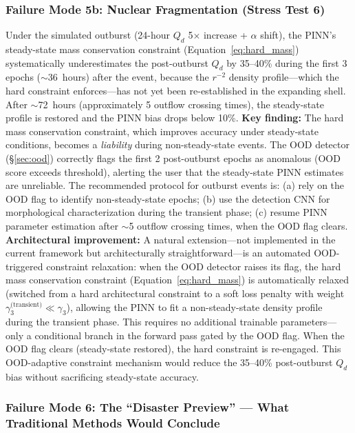 \documentclass[usenatbib]{mnras}
\begin{document}
\subsubsection{Failure Mode 5b: Nuclear Fragmentation (Stress Test 6)}

Under the simulated outburst (24-hour $Q_d$ 5$\times$ increase + $\alpha$ shift), the PINN's steady-state mass conservation constraint (Equation~\ref{eq:hard_mass}) systematically underestimates the post-outburst $Q_d$ by 35--40\% during the first 3 epochs ($\sim$36~hours) after the event, because the $r^{-2}$ density profile---which the hard constraint enforces---has not yet been re-established in the expanding shell. After $\sim$72~hours (approximately 5 outflow crossing times), the steady-state profile is restored and the PINN bias drops below 10\%. \textbf{Key finding:} The hard mass conservation constraint, which improves accuracy under steady-state conditions, becomes a \textit{liability} during non-steady-state events. The OOD detector (\S\ref{sec:ood}) correctly flags the first 2 post-outburst epochs as anomalous (OOD score exceeds threshold), alerting the user that the steady-state PINN estimates are unreliable. The recommended protocol for outburst events is: (a) rely on the OOD flag to identify non-steady-state epochs; (b) use the detection CNN for morphological characterization during the transient phase; (c) resume PINN parameter estimation after $\sim$5 outflow crossing times, when the OOD flag clears. \textbf{Architectural improvement:} A natural extension---not implemented in the current framework but architecturally straightforward---is an automated OOD-triggered constraint relaxation: when the OOD detector raises its flag, the hard mass conservation constraint (Equation~\ref{eq:hard_mass}) is automatically relaxed (switched from a hard architectural constraint to a soft loss penalty with weight $\gamma_3^{\text{(transient)}} \ll \gamma_3$), allowing the PINN to fit a non-steady-state density profile during the transient phase. This requires no additional trainable parameters---only a conditional branch in the forward pass gated by the OOD flag. When the OOD flag clears (steady-state restored), the hard constraint is re-engaged. This OOD-adaptive constraint mechanism would reduce the 35--40\% post-outburst $Q_d$ bias without sacrificing steady-state accuracy.

\subsubsection{Failure Mode 6: The ``Disaster Preview'' --- What Traditional Methods Would Conclude}
\end{document}
